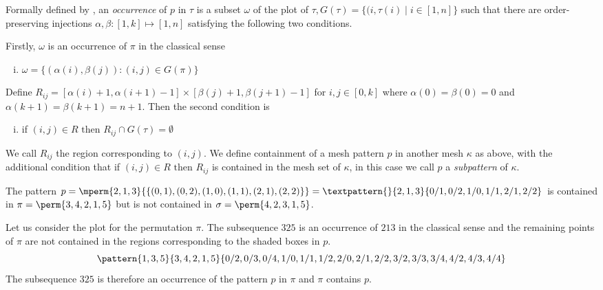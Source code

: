 Formally defined by \textcite{journals/combinatorics/BrandenC11},
an \emph{occurrence} of \(p\) in \(\tau\) is a subset \(\omega\) of the plot of
\(\tau, G(\tau) = \{(i,\tau(i)\mid i\in[1,n]\}\) such that there are order-preserving
injections \(\alpha,\beta:[1,k]\mapsto[1,n]\) satisfying the following two conditions.

\noindent Firstly, \(\omega\) is an occurrence of \(\pi\) in the classical sense
  \begin{enumerate}[i.]
    \item \(\omega = \{(\alpha(i),\beta(j)):(i,j)\in G(\pi)\}\)
  \end{enumerate}\saveenum
  Define \(R_{ij} = [\alpha(i)+1,\alpha(i+1)-1]\times[\beta(j)+1,\beta(j+1)-1]\)
   for \(i,j\in[0,k]\) where \(\alpha(0)=\beta(0)=0\) and \(\alpha(k+1)=\beta(k+1)=n+1\). Then
   the second condition is
  \begin{enumerate}[i.]\resetenum
  \item if \((i,j) \in R \text{ then } R_{ij} \cap G(\tau) = \emptyset\)
\end{enumerate}
We call \(R_{ij}\) the region corresponding to \((i,j)\).
We define containment of a mesh pattern \(p\) in another mesh \(\kappa\) as above,
with the additional condition that if \((i,j)\in R\text{ then } R_{ij}\) is
contained in the mesh set of \(\kappa\), in this case we call \(p\) a \emph{subpattern}
of \(\kappa\).

\begin{example}
    The pattern \(p=\mperm{2,1,3}{\{(0,1),(0,2),(1,0),(1,1),(2,1),(2,2)\}}=
    \textpattern{}{ 2, 1, 3 }{ 0/1, 0/2, 1/0, 1/1, 2/1, 2/2 }\) is contained in
    \(\pi = \perm{3,4,2,1,5}\) but is not contained in \(\sigma = \perm{4,2,3,1,5}\).
\end{example}

Let us consider the plot for the permutation \(\pi\). The subsequence \(325\) is
an occurrence of \(213\) in the classical sense and the remaining points of \(\pi\)
are not contained in the regions corresponding to the shaded boxes in \(p\).
\begin{equation*}
    \pattern{1,3,5}{3,4,2,1,5}{0/2,0/3,0/4,
                               1/0,1/1,1/2,
                               2/0,2/1,2/2,
                               3/2,3/3,3/4,
                               4/2,4/3,4/4}
\end{equation*}
The subsequence \(325\) is therefore an occurrence of the pattern \(p\) in \(\pi\) and
\(\pi\) contains \(p\).

